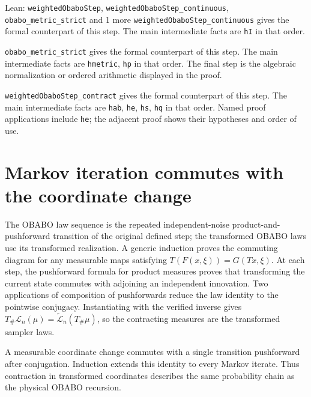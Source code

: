 \documentclass[11pt,a4paper]{article}
\begin{document}
\begin{leanbox}{Lean: \texttt{weightedObaboStep}, \texttt{weightedObaboStep\_\allowbreak{}continuous}, \texttt{obabo\_\allowbreak{}metric\_\allowbreak{}strict} and 1 more}
\texttt{weighted\allowbreak{}Obabo\allowbreak{}Step\_\allowbreak{}continuous} gives the formal counterpart of this step. The main intermediate facts are \texttt{h\allowbreak{}I} in that order.




\texttt{obabo\_\allowbreak{}metric\_\allowbreak{}strict} gives the formal counterpart of this step. The main intermediate facts are \texttt{hmetric}, \texttt{hp} in that order. The final step is the algebraic normalization or ordered arithmetic displayed in the proof.




\texttt{weighted\allowbreak{}Obabo\allowbreak{}Step\_\allowbreak{}contract} gives the formal counterpart of this step. The main intermediate facts are \texttt{hab}, \texttt{he}, \texttt{hs}, \texttt{hq} in that order. Named proof applications include \texttt{he}; the adjacent proof shows their hypotheses and order of use.
\end{leanbox}

\section{\texorpdfstring{Markov iteration commutes with the coordinate change}{Markov iteration commutes with the coordinate change}}


The OBABO law sequence is the repeated independent-noise product-and-pushforward transition of the original defined step; the transformed OBABO laws use its transformed realization. A generic induction proves the commuting diagram for any measurable maps satisfying \(T(F(x,\xi))=G(Tx,\xi)\). At each step, the pushforward formula for product measures proves that transforming the current state commutes with adjoining an independent innovation. Two applications of composition of pushforwards reduce the law identity to the pointwise conjugacy. Instantiating with the verified inverse gives \(T_\#\mathcal L_n(\mu)=\widetilde{\mathcal L}_n(T_\#\mu)\), so the contracting measures are the transformed sampler laws.



A measurable coordinate change commutes with a single transition pushforward after conjugation. Induction extends this identity to every Markov iterate. Thus contraction in transformed coordinates describes the same probability chain as the physical OBABO recursion.
\end{document}
